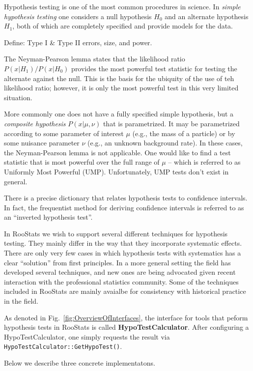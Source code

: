 \documentclass[11pt]{article}
\begin{document}
Hypothesis testing is one of the most common procedures in science.  In \textit{simple hypothesis testing} one considers a null hypothesis $H_0$ and an alternate hypothesis $H_1$, both of which are completely specified and provide models for the data.  

Define: Type I \& Type II errors, size, and power.

The Neyman-Pearson lemma states that the likelihood ratio $P(x|H_1)/P(x|H_0)$ provides the most powerful test statistic for testing the alternate against the null.  This is the basis for the ubiquity of the use of teh likelihood ratio; however, it is only the most powerful test in this very limited situation.

More commonly one does not have a fully specified simple hypothesis, but a \textit{composite hypothesis} $P(x|\mu,\nu)$ that is parametrized.  It may be parametrized according to some parameter of interest $\mu$ (e.g., the mass of a particle) or by some nuisance parameter $\nu$ (e.g., an unknown background rate).  In these cases, the Neyman-Pearson lemma is not applicable.  One would like to find a test statistic that is most powerful over the full range of $\mu$ -- which is referred to as Uniformly Most Powerful (UMP).  Unfortunately, UMP tests don't exist in general.  

There is a precise dictionary that relates hypothesis tests to confidence intervals.  In fact, the frequentist method for deriving confidence intervals is referred to as an ``inverted hypothesis test''.

In RooStats we wish to support several different techniques for hypothesis testing.  They mainly differ in the way that they incorporate systematic effects.  There are only very few cases in which hypothesis tests with systematics has a clear ``solution'' from first principles.  In a more general setting the field has developed several techniques, and new ones are being advocated given recent interaction with the professional statistics community.  Some of the techniques included in RooStats are mainly avaialbe for consistency with historical practice in the field.

As denoted in Fig.~\ref{fig:OverviewOfInterfaces}, the interface for tools that peform hypothesis tests in RooStats is called \textbf{HypoTestCalculator}.  After configuring a HypoTestCalculator, one simply requests the result via \texttt{HypoTestCalculator::GetHypoTest()}.

Below we describe three concrete implementatons.
\end{document}
